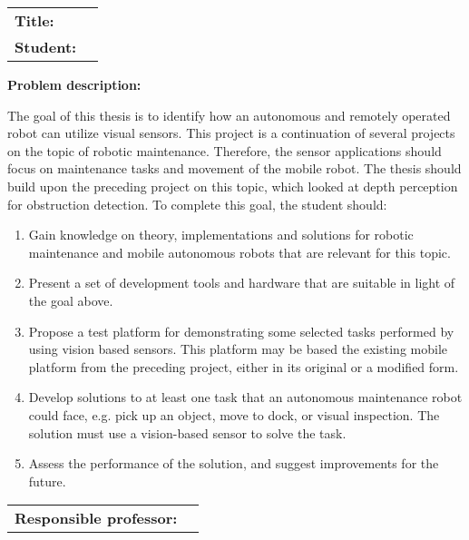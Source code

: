 \begin{titlingpage}

\noindent
\begin{tabular}{@{}p{4cm}l}
\textbf{Title:} 	& \thetitle \\
\textbf{Student:}	& \theauthor \\
\end{tabular}

\vspace{4ex}
\noindent\textbf{Problem description:}
\vspace{2ex}

The goal of this thesis is to identify how an autonomous and remotely operated robot can utilize visual sensors. This project is a continuation of several projects on the topic of robotic maintenance. Therefore, the sensor applications should focus on maintenance tasks and movement of the mobile robot. The thesis should build upon the preceding project on this topic, which looked at depth perception for obstruction detection. To complete this goal, the student should:

\begin{enumerate}
	\item	Gain knowledge on theory, implementations and solutions for robotic maintenance and mobile autonomous robots that are relevant for this topic.
	\item	Present a set of development tools and hardware that are suitable in light of the goal above. 
	\item	Propose a test platform for demonstrating some selected tasks performed by using vision based sensors. This platform may be based the existing mobile platform from the preceding project, either in its original or a modified form.
	\item	Develop solutions to at least one task that an autonomous maintenance robot could face, e.g. pick up an object, move to dock, or visual inspection. The solution must use a vision-based sensor to solve the task.
	\item	Assess the performance of the solution, and suggest improvements for the future.
\end{enumerate}


\vspace{6ex}

\noindent
\begin{tabular}{@{}p{4cm}l}
\textbf{Responsible professor:} 	& \theprofessor \\
\end{tabular}

\end{titlingpage}